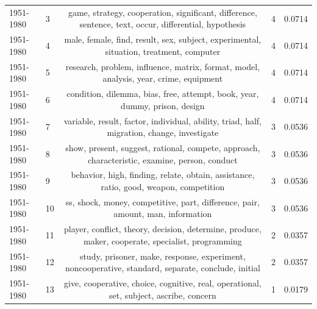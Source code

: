 \documentclass{article}
\theoremstyle{definition}
\begin{document}
\begin{table}[!hbtp]
\begin{center}
{\begin{tabular}{llccc}
             1951-1980 &               3 &         game, strategy, cooperation, significant, difference, sentence, text, occur, differential, hypothesis &                4 &                  0.0714 \\
             1951-1980 &               4 &                        male, female, find, result, sex, subject, experimental, situation, treatment, computer &                4 &                  0.0714 \\
             1951-1980 &               5 &                         research, problem, influence, matrix, format, model, analysis, year, crime, equipment &                4 &                  0.0714 \\
             1951-1980 &               6 &                                    condition, dilemma, bias, free, attempt, book, year, dummy, prison, design &                4 &                  0.0714 \\
             1951-1980 &               7 &                    variable, result, factor, individual, ability, triad, half, migration, change, investigate &                3 &                  0.0536 \\
             1951-1980 &               8 &                 show, present, suggest, rational, compete, approach, characteristic, examine, person, conduct &                3 &                  0.0536 \\
             1951-1980 &               9 &                         behavior, high, finding, relate, obtain, assistance, ratio, good, weapon, competition &                3 &                  0.0536 \\
             1951-1980 &              10 &                               ss, shock, money, competitive, part, difference, pair, amount, man, information &                3 &                  0.0536 \\
             1951-1980 &              11 &             player, conflict, theory, decision, determine, produce, maker, cooperate, specialist, programming &                2 &                  0.0357 \\
             1951-1980 &              12 &            study, prisoner, make, response, experiment, noncooperative, standard, separate, conclude, initial &                2 &                  0.0357 \\
             1951-1980 &              13 &                       give, cooperative, choice, cognitive, real, operational, set, subject, ascribe, concern &                1 &                  0.0179 \\

\end{tabular}}
\end{center}
\end{table}
\end{document}
